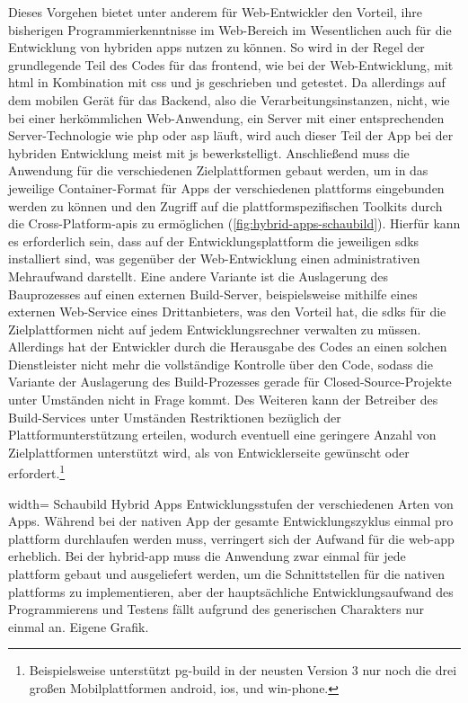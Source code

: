 Dieses Vorgehen bietet unter anderem für Web-Entwickler den Vorteil, ihre bisherigen Programmierkenntnisse im Web-Bereich im Wesentlichen auch für die Entwicklung von hybriden \glspl{app} nutzen zu können. 
So wird in der Regel der grundlegende Teil des Codes für das \gls{frontend}, wie bei der Web-Entwicklung, mit \gls{html} in Kombination mit \gls{css} und \gls{js} geschrieben und getestet. 
Da allerdings auf dem mobilen Gerät für das Backend, also die Verarbeitungsinstanzen, nicht, wie bei einer herkömmlichen Web-Anwendung, ein Server mit einer entsprechenden Server-Technologie wie \gls{php} oder \gls{asp} läuft, wird auch dieser Teil der App bei der hybriden Entwicklung meist mit \gls{js} bewerkstelligt. 
Anschließend muss die Anwendung für die verschiedenen Zielplattformen gebaut werden, um in das jeweilige Container-Format für Apps der verschiedenen \glspl{plattform} eingebunden werden zu können und den Zugriff auf die plattformspezifischen Toolkits durch die Cross-Platform-\glspl{api} zu ermöglichen (\autoref{fig:hybrid-apps-schaubild}).
Hierfür kann es erforderlich sein, dass auf der Entwicklungsplattform die jeweiligen \glspl{sdk} installiert sind, was gegenüber der Web-Entwicklung einen administrativen Mehraufwand darstellt.
Eine andere Variante ist die Auslagerung des Bauprozesses auf einen externen Build-Server, beispielsweise mithilfe eines externen Web-Service eines Drittanbieters, was den Vorteil hat, die \glspl{sdk} für die Zielplattformen nicht auf jedem Entwicklungsrechner verwalten zu müssen. 
Allerdings hat der Entwickler durch die Herausgabe des Codes an einen solchen Dienstleister nicht mehr die vollständige Kontrolle über den Code, sodass die Variante der Auslagerung des Build-Prozesses gerade für Closed-Source-Projekte unter Umständen nicht in Frage kommt. 
Des Weiteren kann der Betreiber des Build-Services unter Umständen Restriktionen bezüglich der Plattformunterstützung erteilen, wodurch eventuell eine geringere Anzahl von Zielplattformen unterstützt wird, als von Entwicklerseite gewünscht oder erfordert.\footnote{Beispielsweise unterstützt \gls{pg-build} in der neusten Version 3 nur noch die drei großen Mobilplattformen \gls{android}, \gls{ios}, und \gls{win-phone}.}

	{width=\fullimagesize}
	{Schaubild Hybrid Apps}
		{Entwicklungsstufen der verschiedenen Arten von Apps. Während bei der nativen App der gesamte Entwicklungszyklus einmal pro \gls{plattform} durchlaufen werden muss, verringert sich der Aufwand für die \gls{web-app} erheblich. Bei der \gls{hybrid-app} muss die Anwendung zwar einmal für jede \gls{plattform} gebaut und ausgeliefert werden, um die Schnittstellen für die nativen \glspl{plattform} zu implementieren, aber der hauptsächliche Entwicklungsaufwand des Programmierens und Testens fällt aufgrund des generischen Charakters nur einmal an.}
	{Eigene Grafik.}

